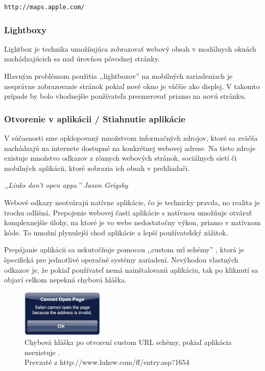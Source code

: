 \begin{verbatim}
http://maps.apple.com/
\end{verbatim}



\subsubsection{Lightboxy} %
\label{subsub:lightboxy}

Lightbox je technika umožňujúca zobrazovať webový obsah v modálnych oknách nachádzajúcich sa nad úrovňou pôvodnej stránky.

Hlavným problémom použitia ,,lightboxov'' na mobilných zariadeniach je nesprávne zobrazovanie stránok pokiaľ nové okno je väčšie ako displej. V takomto prípade by bolo vhodnejšie používateľa presmerovať priamo na novú stránku.


\subsubsection{Otvorenie v aplikácii / Stiahnutie aplikácie} %
\label{ssub:otvorenie_v_aplik_cii}

V súčasnosti sme opklopovaný množstvom informačných zdrojov, ktoré sa zväčša nachádzajú na internete dostupné na konkrétnej webovej adrese. Na tieto zdroje existuje množstvo odkazov z rôznych webových stránok, sociálnych sietí či mobilných aplikácii, ktoré zobrazia ich obsah v prehliadači.

\begin{fancybox}
\textit{,,Links don’t open apps.'' Jason Grigsby} \cite{links}
\end{fancybox}

Webové odkazy neotvárajú natívne aplikácie, čo je technicky pravda, no realita je trochu odlišná. Prepojenie webovej časti aplikácie s natívnou umožňuje otvárať komplexnejšie úlohy, na ktoré je vo webe nedostatočny výkon, priamo v natívnom kóde. To umožní plynulejší chod aplikácie a lepší používateľský zážitok.

Prepájanie aplikácii sa uskutočňuje pomocou ,,custom url schémy'' \cite{urlscheme}, ktorá je špecifická pre jednotlivé operačné systémy zariadení. Nevýhodou vlastných odkazov je, že pokiaľ používateľ nemá nainštalovanú aplikáciu, tak po kliknutí sa objaví celkom nepekná chybová hláška.

\begin{figure}[H]
	\centering
	\includegraphics[width=0.35\textwidth]{img/customerror.png}
	\caption[Chybová hláška po otvorení custom URL schémy, pokiaľ aplikácia neexistuje]{
		Chybová hláška po otvorení custom URL schémy, pokiaľ aplikácia neexistuje \cite{customscheme}.\\
		Prevzaté z http://www.lukew.com/ff/entry.asp?1654}
	\label{fig: customerror}
\end{figure}

